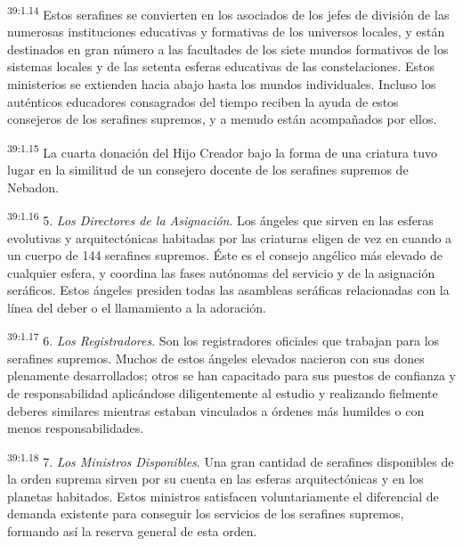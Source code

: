 \par
\textsuperscript{39:1.14} Estos serafines se convierten en los asociados de los jefes de división de las numerosas instituciones educativas y formativas de los universos locales, y están destinados en gran número a las facultades de los siete mundos formativos de los sistemas locales y de las setenta esferas educativas de las constelaciones. Estos ministerios se extienden hacia abajo hasta los mundos individuales. Incluso los auténticos educadores consagrados del tiempo reciben la ayuda de estos consejeros de los serafines supremos, y a menudo están acompañados por ellos.

\par
\textsuperscript{39:1.15} La cuarta donación del Hijo Creador bajo la forma de una criatura tuvo lugar en la similitud de un consejero docente de los serafines supremos de Nebadon.

\par
\textsuperscript{39:1.16} 5. \textit{Los Directores de la Asignación}. Los ángeles que sirven en las esferas evolutivas y arquitectónicas habitadas por las criaturas eligen de vez en cuando a un cuerpo de 144 serafines supremos. Éste es el consejo angélico más elevado de cualquier esfera, y coordina las fases autónomas del servicio y de la asignación seráficos. Estos ángeles presiden todas las asambleas seráficas relacionadas con la línea del deber o el llamamiento a la adoración.

\par
\textsuperscript{39:1.17} 6. \textit{Los Registradores}. Son los registradores oficiales que trabajan para los serafines supremos. Muchos de estos ángeles elevados nacieron con sus dones plenamente desarrollados; otros se han capacitado para sus puestos de confianza y de responsabilidad aplicándose diligentemente al estudio y realizando fielmente deberes similares mientras estaban vinculados a órdenes más humildes o con menos responsabilidades.

\par
\textsuperscript{39:1.18} 7. \textit{Los Ministros Disponibles}. Una gran cantidad de serafines disponibles de la orden suprema sirven por su cuenta en las esferas arquitectónicas y en los planetas habitados. Estos ministros satisfacen voluntariamente el diferencial de demanda existente para conseguir los servicios de los serafines supremos, formando así la reserva general de esta orden.

